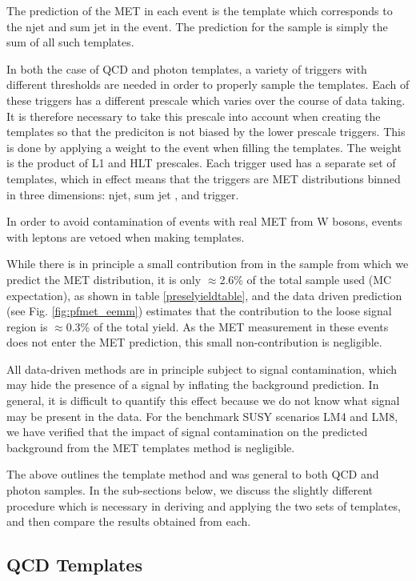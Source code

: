 The prediction of the MET in each \Z event is the template which corresponds to the njet and 
sum jet \pt in the \Z event. The prediction for the \Z sample is simply the sum of all such templates.

In both the case of QCD and photon templates, a variety of triggers with different \pt thresholds 
are needed in order to properly sample the templates. Each of these triggers has a different prescale
which varies over the course of data taking. It is therefore necessary to take this prescale into
account when creating the templates so that the prediciton is not biased by the lower prescale 
triggers. This is done by applying a weight to the event when filling the templates. The weight 
is the product of L1 and HLT prescales. Each trigger used has a separate set of templates, which 
in effect means that the triggers are MET distributions binned in three dimensions: njet, 
sum jet \pt, and trigger.

In order to avoid contamination of events with real MET from W bosons, events with leptons 
are vetoed when making templates.

While there is in principle a small contribution from \ttbar in the \Z sample from 
which we predict the MET distribution, it is only $\approx$2.6\% of the total sample used
(MC expectation),
as shown in table \ref{preselyieldtable}, and the data driven prediction (see Fig. 
\ref{fig:pfmet_eemm}) estimates that the \ttbar contribution to the loose signal 
region is $\approx$0.3\% of the total \Z yield. As the MET measurement in these events 
does not enter the MET prediction, this small non-\Z contribution is negligible.

All data-driven methods are in principle subject to signal contamination, which may hide
the presence of a signal by inflating the background prediction. In general, it is difficult
to quantify this effect because we do not know what signal may be present in the data.
For the benchmark SUSY scenarios LM4 and LM8, we have verified that the impact of signal
contamination on the predicted background from the MET templates method is negligible.

The above outlines the template method and was general to both QCD and photon samples. In the 
sub-sections below, we discuss the slightly different procedure which is necessary in deriving 
and applying the two sets of templates, and then compare the results obtained from each.


\subsection{QCD Templates}
\label{sec:templatesqcd}

